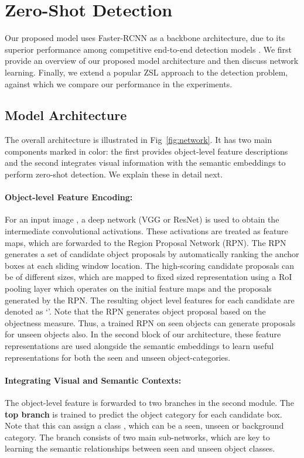 \documentclass[runningheads]{llncs}
\begin{document}
\section{Zero-Shot Detection} \vspace{-0.5em}
   Our proposed model uses Faster-RCNN \cite{Faster_RCNN_2017} as a backbone architecture, due to its superior performance among competitive end-to-end detection models \cite{Dai_RFCN_2016,Liu_SSD_2016,Redmon_yolo9000_2016}. We first provide an overview of our proposed model architecture and then discuss network learning. Finally, we extend a popular ZSL approach to the detection problem, against which we compare our performance in the experiments.
    
\subsection{Model Architecture}
The overall architecture is illustrated in Fig~\ref{fig:network}. It has two main components marked in color: the first provides object-level feature descriptions and the second integrates visual information with the semantic embeddings to perform zero-shot detection. We explain these in detail next.  

\paragraph{Object-level Feature Encoding:}
For an input image , a deep network (VGG or ResNet) is used to obtain the intermediate convolutional activations. These activations are treated as feature maps, which are forwarded to the Region Proposal Network (RPN). The RPN generates a set of candidate object proposals by automatically ranking the anchor boxes at each sliding window location. The high-scoring candidate proposals can be of different sizes, which are mapped to fixed sized representation using a RoI pooling layer which operates on the initial feature maps and the proposals generated by the RPN. The resulting object level features for each candidate are denoted as `'. Note that the RPN generates object proposal based on the objectness measure. Thus, a trained RPN on seen objects can generate proposals for unseen objects also. In the second block of our architecture, these feature representations are used alongside the semantic embeddings to learn useful representations for both the seen and unseen object-categories.

\paragraph{Integrating Visual and Semantic Contexts:}
The object-level feature  is forwarded to two branches in the second module. The \textbf{top branch} is trained to predict the object category for each candidate box. Note that this can assign a class , which can be a seen, unseen or background category. The branch consists of two main sub-networks, which are key to learning the semantic relationships between seen and unseen object classes. 
\end{document}
